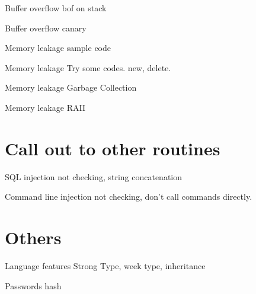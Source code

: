 \documentclass{beamer}
\begin{document}
\begin{CJK*}{UTF8}{bsmi}
    \begin{frame}{Buffer overflow}
        bof on stack
    \end{frame}

    \begin{frame}{Buffer overflow}
        canary
    \end{frame}

    \begin{frame}{Memory leakage}
        sample code
    \end{frame}

    \begin{frame}{Memory leakage}
        Try some codes.
        new, delete.
    \end{frame}

    \begin{frame}{Memory leakage}
        Garbage Collection
    \end{frame}

    \begin{frame}{Memory leakage}
        RAII
    \end{frame}

    \section{Call out to other routines}
    \begin{frame}{SQL injection}
        not checking, string concatenation
    \end{frame}

    \begin{frame}{Command line injection}
        not checking, don't call commands directly.
    \end{frame}

    \section{Others}
    \begin{frame}{Language features}
        Strong Type, week type, inheritance
    \end{frame}

    \begin{frame}{Passwords}
        hash
    \end{frame}


\end{CJK*}
\end{document}
